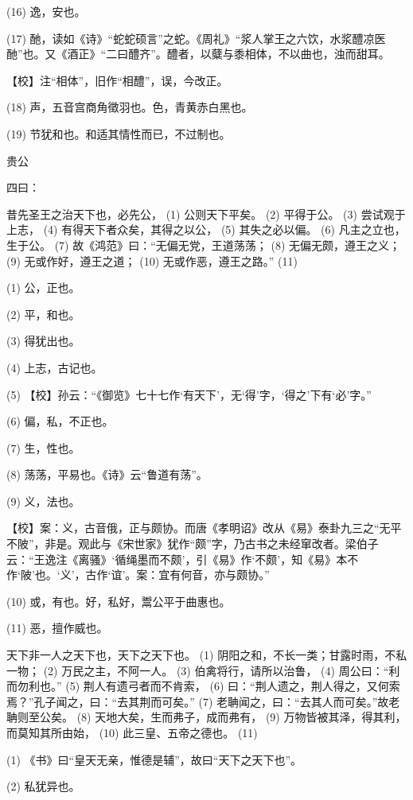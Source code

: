 \documentclass[12pt,UTF8]{ctexbook}
\begin{document}
(16) 逸，安也。

(17) 酏，读如《诗》“蛇蛇硕言”之蛇。《周礼》“浆人掌王之六饮，水浆醴凉医酏”也。又《酒正》“二曰醴齐”。醴者，以糵与黍相体，不以曲也，浊而甜耳。

【校】注“相体”，旧作“相醴”，误，今改正。

(18) 声，五音宫商角徵羽也。色，青黄赤白黑也。

(19) 节犹和也。和适其情性而已，不过制也。





贵公


四曰：

昔先圣王之治天下也，必先公， (1) 公则天下平矣。 (2) 平得于公。 (3) 尝试观于上志， (4) 有得天下者众矣，其得之以公， (5) 其失之必以偏。 (6) 凡主之立也，生于公。 (7) 故《鸿范》曰：“无偏无党，王道荡荡； (8) 无偏无颇，遵王之义； (9) 无或作好，遵王之道； (10) 无或作恶，遵王之路。” (11)

(1) 公，正也。

(2) 平，和也。

(3) 得犹出也。

(4) 上志，古记也。

(5) 【校】孙云：“《御览》七十七作‘有天下’，无‘得’字，‘得之’下有‘必’字。”

(6) 偏，私，不正也。

(7) 生，性也。

(8) 荡荡，平易也。《诗》云“鲁道有荡”。

(9) 义，法也。

【校】案：义，古音俄，正与颇协。而唐《孝明诏》改从《易》泰卦九三之“无平不陂”，非是。观此与《宋世家》犹作“颇”字，乃古书之未经窜改者。梁伯子云：“王逸注《离骚》‘循绳墨而不颇’，引《易》作‘不颇’，知《易》本不作‘陂’也。‘义’，古作‘谊’。案：宜有何音，亦与颇协。”

(10) 或，有也。好，私好，鬻公平于曲惠也。

(11) 恶，擅作威也。

天下非一人之天下也，天下之天下也。 (1) 阴阳之和，不长一类；甘露时雨，不私一物； (2) 万民之主，不阿一人。 (3) 伯禽将行，请所以治鲁， (4) 周公曰：“利而勿利也。” (5) 荆人有遗弓者而不肯索， (6) 曰：“荆人遗之，荆人得之，又何索焉？”孔子闻之，曰：“去其荆而可矣。” (7) 老聃闻之，曰：“去其人而可矣。”故老聃则至公矣。 (8) 天地大矣，生而弗子，成而弗有， (9) 万物皆被其泽，得其利，而莫知其所由始， (10) 此三皇、五帝之德也。 (11)

(1) 《书》曰“皇天无亲，惟德是辅”，故曰“天下之天下也”。

(2) 私犹异也。
\end{document}

